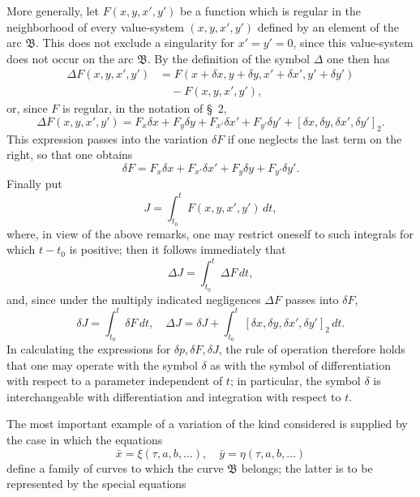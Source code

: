 \documentclass[11pt,a4paper,leqno]{article}
\begin{document}
More generally, let $F(x,y,x',y')$ be a function which is regular in the neighborhood of every value-system $(x,y,x',y')$ defined by an element of the arc $\mathfrak{B}$. This does not exclude a singularity for $x'=y'=0$, since this value-system does not occur on the arc $\mathfrak{B}$. By the definition of the symbol $\Delta$ one then has
\[
\begin{aligned}
 \Delta F(x,y,x',y')
 &=F(x+\delta x,y+\delta y,x'+\delta x',y'+\delta y')\\
 &\quad{}-F(x,y,x',y'),
\end{aligned}
\]
or, since $F$ is regular, in the notation of \S~2,
\[
 \Delta F(x,y,x',y')
 =F_x\delta x+F_y\delta y+F_{x'}\delta x'+F_{y'}\delta y'
 +[\delta x,\delta y,\delta x',\delta y']_2.
\]
This expression passes into the variation $\delta F$ if one neglects the last term on the right, so that one obtains
\[
 \delta F=F_x\delta x+F_{x'}\delta x'+F_y\delta y+F_{y'}\delta y'.
\]
Finally put
\[
 J=\int_{t_0}^{t} F(x,y,x',y')\,dt,
\]
where, in view of the above remarks, one may restrict oneself to such integrals for which $t-t_0$ is positive; then it follows immediately that
\[
 \Delta J=\int_{t_0}^{t}\Delta F\,dt,
\]
and, since under the multiply indicated negligences $\Delta F$ passes into $\delta F$,
\[
 \delta J=\int_{t_0}^{t}\delta F\,dt,\quad
 \Delta J=\delta J+\int_{t_0}^{t}[\delta x,\delta y,\delta x',\delta y']_2\,dt.
\]
In calculating the expressions for $\delta p,\delta F,\delta J$, the rule of operation therefore holds that one may operate with the symbol $\delta$ as with the symbol of differentiation with respect to a parameter independent of $t$; in particular, the symbol $\delta$ is interchangeable with differentiation and integration with respect to $t$.

The most important example of a variation of the kind considered is supplied by the case in which the equations
\begin{equation}\tag{1}
 \bar{x}=\xi(\tau,a,b,\ldots),\quad \bar{y}=\eta(\tau,a,b,\ldots)
\end{equation}
define a family of curves to which the curve $\mathfrak{B}$ belongs; the latter is to be represented by the special equations
\end{document}
